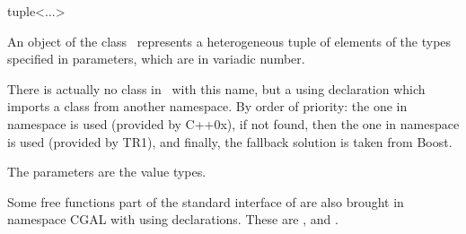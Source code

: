 

\begin{ccRefClass}{tuple<...>}

\ccDefinition

An object of the class \ccClassTemplateName\ represents a heterogeneous tuple of elements
of the types specified in parameters, which are in variadic number.

There is actually no class in \cgal\ with this name, but a using declaration which
imports a class from another namespace.  By order of priority: the one in namespace
 is used (provided by C++0x), if not found, then the one in namespace
 is used (provided by TR1), and finally, the fallback solution 
is taken from Boost.


  \ccParameters

  The parameters  are the value types.


Some free functions part of the standard interface of  are also
brought in namespace CGAL with using declarations.  These are ,
 and .

\end{ccRefClass}

\ccParDims
